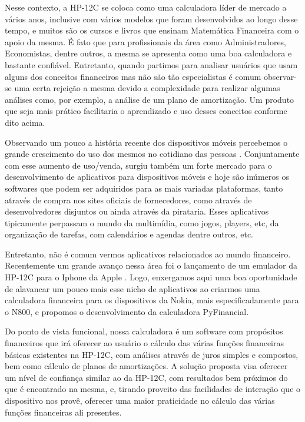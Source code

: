 Nesse contexto, a HP-12C \cite{hp12c} se coloca como uma calculadora líder de mercado a vários anos, inclusive com vários modelos que foram desenvolvidos ao longo desse tempo, e muitos são os cursos e livros que ensinam Matemática Financeira com o apoio da mesma. É fato que para profissionais da área como Administradores, Economistas, dentre outros, a mesma se apresenta como uma boa calculadora e bastante confiável. Entretanto, quando partimos para analisar usuários que usam alguns dos conceitos financeiros mas não são tão especialistas é comum observar-se uma certa rejeição a mesma devido a complexidade para realizar algumas análises como, por exemplo, a análise de um plano de amortização. Um produto que seja mais prático facilitaria o aprendizado e uso desses conceitos conforme dito acima.

Observando um pouco a história recente dos dispositivos móveis percebemos o grande crescimento do uso dos mesmos no cotidiano das pessoas \cite{celular}. Conjuntamente com esse aumento de uso/venda, surgiu também um forte mercado para o desenvolvimento de aplicativos para dispositivos móveis e hoje são inúmeros os softwares que podem ser adquiridos para as mais variadas plataformas, tanto através de compra nos sites oficiais de fornecedores, como através de desenvolvedores disjuntos ou ainda através da pirataria. Esses aplicativos tipicamente perpassam o mundo da multimídia, como jogos, players, etc, da organização de tarefas, com calendários e agendas dentre outros, etc.

Entretanto, não é comum vermos aplicativos relacionados ao mundo financeiro. Recentemente um grande avanço nessa área foi o lançamento de um emulador da HP-12C para o Iphone da Apple \cite{iphone}. Logo, enxergamos aqui uma boa oportunidade de alavancar um pouco mais esse nicho de aplicativos ao criarmos uma calculadora financeira para os dispositivos da Nokia, mais especificadamente para o N800, e propomos o desenvolvimento da calculadora PyFinancial. 

Do ponto de vista funcional, nossa calculadora é um software com propósitos financeiros que irá oferecer ao usuário o cálculo das várias funções financeiras básicas existentes na HP-12C, com análises através de juros simples e compostos, bem como cálculo de planos de amortizações.  A solução proposta visa oferecer um nível de confiança similar ao da HP-12C, com resultados bem próximos do que é encontrado na mesma, e, tirando proveito das facilidades de interação que o dispositivo nos provê, oferecer uma maior praticidade no cálculo das várias funções financeiras ali presentes.


